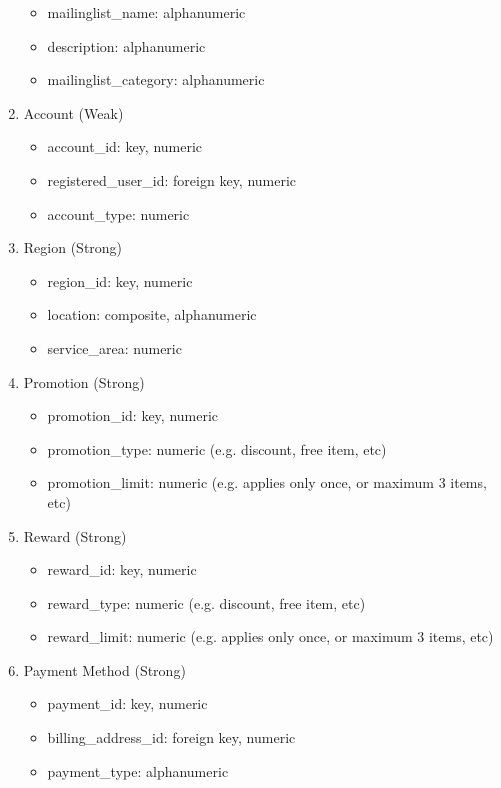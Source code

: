 \documentclass{article}
\begin{document}
\begin{enumerate}
\begin{itemize}
        \item mailinglist\_name: alphanumeric
        \item description: alphanumeric
        \item mailinglist\_category: alphanumeric
    \end{itemize}
\item Account (Weak)
    \begin{itemize}
        \item account\_id: key, numeric
        \item registered\_user\_id: foreign key, numeric
        \item account\_type: numeric
    \end{itemize}
\item Region (Strong)
    \begin{itemize}
        \item region\_id: key, numeric
        \item location: composite, alphanumeric
        \item service\_area: numeric
    \end{itemize}
\item Promotion (Strong)
    \begin{itemize}
        \item promotion\_id: key, numeric
        \item promotion\_type: numeric (e.g. discount, free item, etc)
        \item promotion\_limit: numeric (e.g. applies only once, or maximum 3 items, etc)
    \end{itemize}
\item Reward (Strong)
    \begin{itemize}
        \item reward\_id: key, numeric
        \item reward\_type: numeric (e.g. discount, free item, etc)
        \item reward\_limit: numeric (e.g. applies only once, or maximum 3 items, etc)
    \end{itemize}
\item Payment Method (Strong)
    \begin{itemize}
        \item payment\_id: key, numeric
        \item billing\_address\_id: foreign key, numeric
        \item payment\_type: alphanumeric
    \end{itemize}

\end{enumerate}
\end{document}
